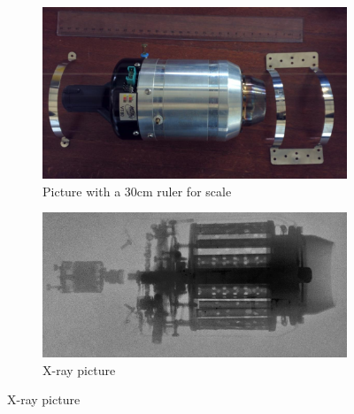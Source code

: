 \begin{figure}[p]
    \centering
    \caption{JetsMunt VT-80 jet engine}
    \label{fig:engine}
    \begin{subfigure}{\textwidth}
        \includegraphics[width=\textwidth]{fig/JetsMuntVT-80.jpg}
        \caption{Picture with a 30cm ruler for scale}
        \label{fig:engine!visible}
    \end{subfigure}
    \begin{subfigure}{\textwidth}
        \includegraphics[width=\textwidth]{fig/JetsMuntVT-80X-ray_enhanced.jpg}
        \caption{X-ray picture}
        \label{fig:engine!x-ray}
    \end{subfigure}
\end{figure}


